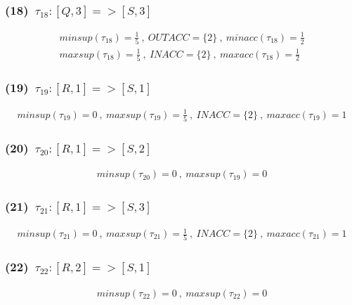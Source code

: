 \documentclass[a4paper,12pt]{jarticle}
\begin{document}
\subsubsection*{(18)~$\tau_{18}:[Q,3]=>[S,3]$}
\vspace{-4mm}
%
\begin{align*}
 minsup(\tau_{18})=\frac{1}{5}~,~OUTACC=\{2\}~,~minacc(\tau_{18})=\frac{1}{2}\\
 maxsup(\tau_{18})=\frac{1}{5}~,~INACC=\{2\}~,~maxacc(\tau_{18})=\frac{1}{2}
\end{align*}
%
\vspace{-10mm}
\subsubsection*{(19)~$\tau_{19}:[R,1]=>[S,1]$}
\vspace{-4mm}
%
\begin{align*}
 minsup(\tau_{19})=0~,~maxsup(\tau_{19})=\frac{1}{5}~,~INACC=\{2\}~,~maxacc(\tau_{19})=1
\end{align*}
%
\vspace{-10mm}
\subsubsection*{(20)~$\tau_{20}:[R,1]=>[S,2]$}
\vspace{-4mm}
%
\begin{align*}
 minsup(\tau_{20})=0~,~maxsup(\tau_{19})=0
\end{align*}
%
\vspace{-10mm}
\subsubsection*{(21)~$\tau_{21}:[R,1]=>[S,3]$}
\vspace{-4mm}
%
\begin{align*}
 minsup(\tau_{21})=0~,~maxsup(\tau_{21})=\frac{1}{5}~,~INACC=\{2\}~,~maxacc(\tau_{21})=1
\end{align*}
%
\vspace{-10mm}
\subsubsection*{(22)~$\tau_{22}:[R,2]=>[S,1]$}
\vspace{-4mm}
%
\begin{align*}
 minsup(\tau_{22})=0~,~maxsup(\tau_{22})=0
\end{align*}
%
\vspace{-10mm}
\end{document}
